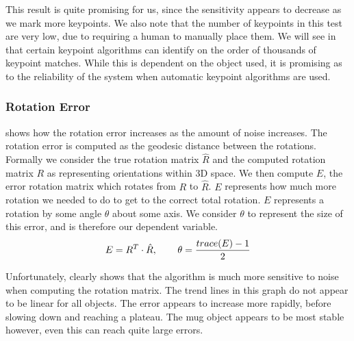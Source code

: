 This result is quite promising for us, since the sensitivity appears to decrease as we mark more keypoints. We also note that the number of keypoints in this test are very low, due to requiring a human to manually place them. We will see in  that certain keypoint algorithms can identify on the order of thousands of keypoint matches. While this is dependent on the object used, it is promising as to the reliability of the system when automatic keypoint algorithms are used.

\subsubsection{Rotation Error}
 shows how the rotation error increases as the amount of noise increases. The rotation error is computed as the geodesic distance between the rotations. Formally we consider the true rotation matrix $\hat{R}$ and the computed rotation matrix $R$ as representing orientations within 3D space. We then compute $E$, the error rotation matrix which rotates from $R$ to $\hat{R}$. $E$ represents how much more rotation we needed to do to get to the correct total rotation. $E$ represents a rotation by some angle $\theta$ about some axis. We consider $\theta$ to represent the size of this error, and is therefore our dependent variable. 
$$E = R^T \cdot \hat{R}, \operatorname{\operatorname{\: \: \: \:} \operatorname{\: \: \: \:}} \theta = \frac{trace(E) - 1}{2}$$

Unfortunately,  clearly shows that the algorithm is much more sensitive to noise when computing the rotation matrix. The trend lines in this graph do not appear to be linear for all objects. The error appears to increase more rapidly, before slowing down and reaching a plateau. The mug object appears to be most stable however, even this can reach quite large errors.\\

